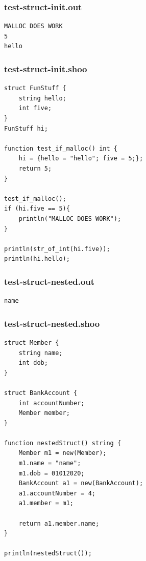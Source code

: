 \documentclass[12pt]{article}
\begin{document}
\subsubsection{test-struct-init.out}
\begin{mdframed}[hidealllines=true,backgroundcolor=green!10]
\begin{lstlisting}
MALLOC DOES WORK
5
hello\end{lstlisting}
\end{mdframed}
\subsubsection{test-struct-init.shoo}
\begin{mdframed}[hidealllines=true,backgroundcolor=blue!10]
\begin{lstlisting}
struct FunStuff {
	string hello;
	int five;
}
FunStuff hi;

function test_if_malloc() int {
	hi = {hello = "hello"; five = 5;};
	return 5;
}

test_if_malloc();
if (hi.five == 5){
	println("MALLOC DOES WORK");
}

println(str_of_int(hi.five));
println(hi.hello);
\end{lstlisting}
\end{mdframed}
\subsubsection{test-struct-nested.out}
\begin{mdframed}[hidealllines=true,backgroundcolor=green!10]
\begin{lstlisting}
name
\end{lstlisting}
\end{mdframed}
\subsubsection{test-struct-nested.shoo}
\begin{mdframed}[hidealllines=true,backgroundcolor=blue!10]
\begin{lstlisting}
struct Member {
    string name;
    int dob;
}

struct BankAccount {
    int accountNumber;
    Member member;
}

function nestedStruct() string {
    Member m1 = new(Member);
    m1.name = "name";
    m1.dob = 01012020;
    BankAccount a1 = new(BankAccount);
    a1.accountNumber = 4;
    a1.member = m1;

    return a1.member.name;
}

println(nestedStruct());
\end{lstlisting}
\end{mdframed}
\end{document}
